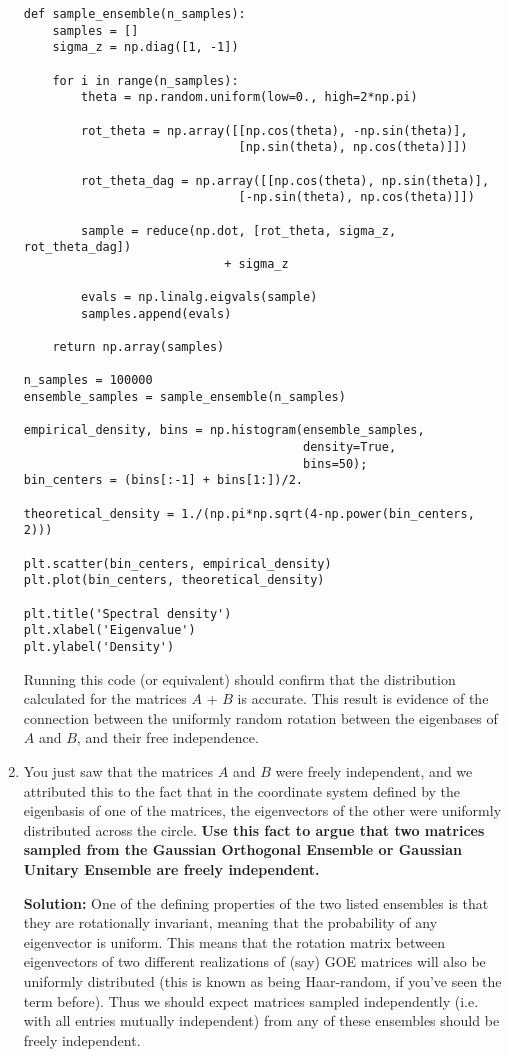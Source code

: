 \documentclass[a4paper]{article}
\begin{document}
\begin{enumerate}[label=(\alph*)]
\begin{tcolorbox}
\begin{lstlisting}
def sample_ensemble(n_samples):
    samples = []
    sigma_z = np.diag([1, -1])
    
    for i in range(n_samples):    
        theta = np.random.uniform(low=0., high=2*np.pi)
        
        rot_theta = np.array([[np.cos(theta), -np.sin(theta)],
                              [np.sin(theta), np.cos(theta)]])

        rot_theta_dag = np.array([[np.cos(theta), np.sin(theta)],
                              [-np.sin(theta), np.cos(theta)]])

        sample = reduce(np.dot, [rot_theta, sigma_z, rot_theta_dag]) 
                            + sigma_z
        
        evals = np.linalg.eigvals(sample)
        samples.append(evals)
    
    return np.array(samples)

n_samples = 100000
ensemble_samples = sample_ensemble(n_samples)

empirical_density, bins = np.histogram(ensemble_samples, 
                                       density=True, 
                                       bins=50);
bin_centers = (bins[:-1] + bins[1:])/2.

theoretical_density = 1./(np.pi*np.sqrt(4-np.power(bin_centers, 2)))

plt.scatter(bin_centers, empirical_density)
plt.plot(bin_centers, theoretical_density)

plt.title('Spectral density')
plt.xlabel('Eigenvalue')
plt.ylabel('Density')
\end{lstlisting}

Running this code (or equivalent) should confirm that the distribution calculated for the matrices $A$ + $B$ is accurate.  This result is evidence of the connection between the uniformly random rotation between the eigenbases of $A$ and $B$, and their free independence.
\end{tcolorbox}

\item You just saw that the matrices $A$ and $B$ were freely independent, and we attributed this to the fact that in the coordinate system defined by the eigenbasis of one of the matrices, the eigenvectors of the other were uniformly distributed across the circle.  \textbf{Use this fact to argue that two matrices sampled from the Gaussian Orthogonal Ensemble or Gaussian Unitary Ensemble are freely independent.}

\begin{tcolorbox}
\textbf{Solution:} 
One of the defining properties of the two listed ensembles is that they are rotationally invariant, meaning that the probability of any eigenvector is uniform.  This means that the rotation matrix between eigenvectors of two different realizations of (say) GOE matrices will also be uniformly distributed (this is known as being Haar-random, if you've seen the term before).  Thus we should expect matrices sampled independently (i.e. with all entries mutually independent) from any of these ensembles should be freely independent.  
\end{tcolorbox}

\end{enumerate}
\end{document}
